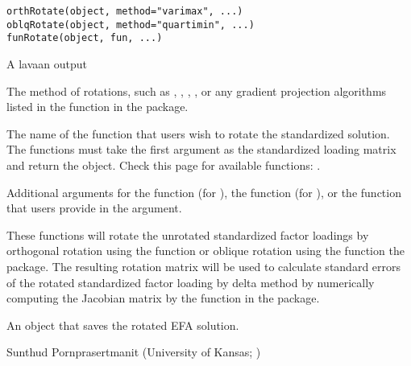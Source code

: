 \documentclass[a4paper]{book}
\begin{document}
%
\begin{Usage}
\begin{verbatim}
orthRotate(object, method="varimax", ...)
oblqRotate(object, method="quartimin", ...)
funRotate(object, fun, ...)
\end{verbatim}
\end{Usage}
%
\begin{Arguments}
\begin{ldescription}
\item[\code{object}] 
A lavaan output

\item[\code{method}] 
The method of rotations, such as , , , , or any gradient projection algorithms listed in the  function in the  package.

\item[\code{fun}] 
The name of the function that users wish to rotate the standardized solution. The functions must take the first argument as the standardized loading matrix and return the  object. Check this page for available functions: .

\item[\code{...}] 
Additional arguments for the  function (for ), the  function (for ), or the function that users provide in the  argument.

\end{ldescription}
\end{Arguments}
%
\begin{Details}\relax
These functions will rotate the unrotated standardized factor loadings by orthogonal rotation using the  function or oblique rotation using the  function the  package. The resulting rotation matrix will be used to calculate standard errors of the rotated standardized factor loading by delta method by numerically computing the Jacobian matrix by the  function in the  package. 
\end{Details}
%
\begin{Value}
An  object that saves the rotated EFA solution.
\end{Value}
%
\begin{Author}\relax
Sunthud Pornprasertmanit (University of Kansas; )
\end{Author}
\end{document}
